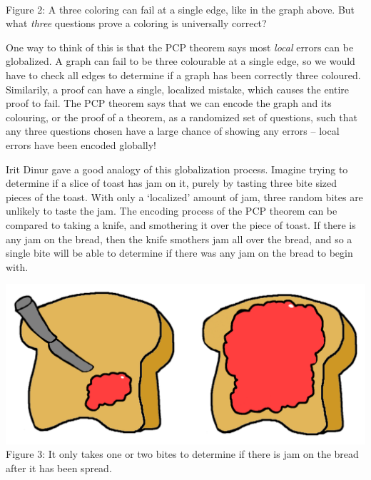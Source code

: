 \documentclass{article}
\theoremstyle{plain}
\theoremstyle{remark}
\theoremstyle{definition}
\begin{document}
\begin{multicols}{2}
\begin{center}
\\
{\small Figure 2: A three coloring can fail at a single edge, like in the graph above. But what {\it three} questions prove a coloring is universally correct?}
\end{center}

 One way to think of this is that the PCP theorem says most {\it local} errors can be globalized. A graph can fail to be three colourable at a single edge, so we would have to check all edges to determine if a graph has been correctly three coloured. Similarily, a proof can have a single, localized mistake, which causes the entire proof to fail. The PCP theorem says that we can encode the graph and its colouring, or the proof of a theorem, as a randomized set of questions, such that any three questions chosen have a large chance of showing any errors -- local errors have been encoded globally!

Irit Dinur gave a good analogy of this globalization process. Imagine trying to determine if a slice of toast has jam on it, purely by tasting three bite sized pieces of the toast. With only a `localized' amount of jam, three random bites are unlikely to taste the jam. The encoding process of the PCP theorem can be compared to taking a knife, and smothering it over the piece of toast. If there is any jam on the bread, then the knife smothers jam all over the bread, and so a single bite will be able to determine if there was any jam on the bread to begin with.

\begin{center}
\includegraphics[scale=0.15]{JamOnToast.png}
\\
{\small Figure 3: It only takes one or two bites to determine if there is jam on the bread after it has been spread.}
\end{center}


\end{multicols}
\end{document}
